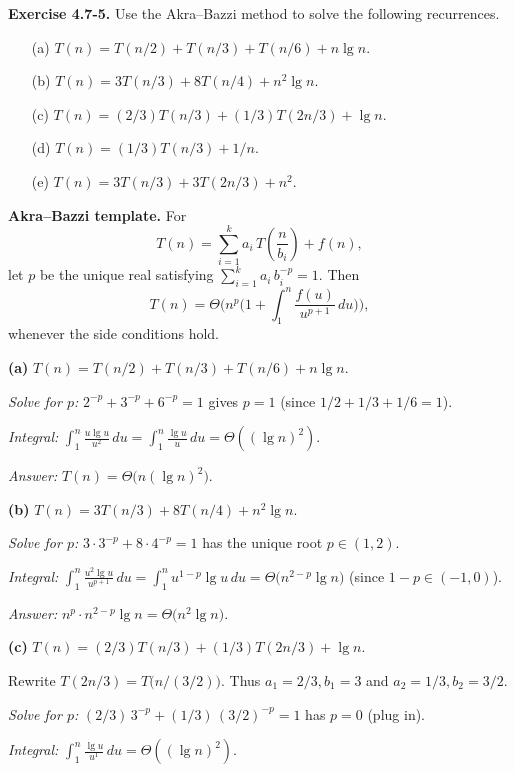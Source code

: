 \documentclass[12pt]{article}
\theoremstyle{definition}
\begin{document}

\noindent\textbf{Exercise 4.7-5.}
Use the Akra–Bazzi method to solve the following recurrences.
\begin{enumerate}\itemsep4pt
\item[(a)] $T(n)=T(n/2)+T(n/3)+T(n/6)+n\lg n.$
\item[(b)] $T(n)=3T(n/3)+8T(n/4)+n^{2}\lg n.$
\item[(c)] $T(n)=(2/3)T(n/3)+(1/3)T(2n/3)+\lg n.$
\item[(d)] $T(n)=(1/3)T(n/3)+1/n.$
\item[(e)] $T(n)=3T(n/3)+3T(2n/3)+n^{2}.$
\end{enumerate}

\medskip
\noindent\textbf{Akra–Bazzi template.}
For
\[
T(n)=\sum_{i=1}^k a_i\,T\!\left(\frac{n}{b_i}\right)+f(n),
\]
let $p$ be the unique real satisfying $\sum_{i=1}^k a_i\,b_i^{-p}=1$. Then
\[
T(n)=\Theta\!\Big(n^{p}\Big(1+\int_{1}^{n}\frac{f(u)}{u^{p+1}}\,du\Big)\Big),
\]
whenever the side conditions hold.

\bigskip
\noindent\textbf{(a)} $T(n)=T(n/2)+T(n/3)+T(n/6)+n\lg n$.

\emph{Solve for $p$:} $2^{-p}+3^{-p}+6^{-p}=1$ gives $p=1$ (since $1/2+1/3+1/6=1$).

\emph{Integral:}
$\displaystyle \int_{1}^{n}\frac{u\lg u}{u^{2}}\,du=\int_{1}^{n}\frac{\lg u}{u}\,du=\Theta((\lg n)^2)$.

\emph{Answer:} $\boxed{T(n)=\Theta\big(n(\lg n)^{2}\big)}$.

\bigskip
\noindent\textbf{(b)} $T(n)=3T(n/3)+8T(n/4)+n^{2}\lg n$.

\emph{Solve for $p$:} $3\cdot 3^{-p}+8\cdot 4^{-p}=1$ has the unique root $p\in(1,2)$.

\emph{Integral:} $\displaystyle \int_{1}^{n}\frac{u^{2}\lg u}{u^{p+1}}\,du
= \int_{1}^{n}u^{1-p}\lg u\,du
= \Theta\!\big(n^{2-p}\lg n\big)$ (since $1-p\in(-1,0)$).

\emph{Answer:} $n^{p}\cdot n^{2-p}\lg n=\boxed{\Theta\big(n^{2}\lg n\big)}$.

\bigskip
\noindent\textbf{(c)} $T(n)=(2/3)T(n/3)+(1/3)T(2n/3)+\lg n$.

Rewrite $T(2n/3)=T\!\big(n/(3/2)\big)$. Thus $a_1=2/3,b_1=3$ and $a_2=1/3,b_2=3/2$.

\emph{Solve for $p$:} $(2/3)\,3^{-p}+(1/3)\,(3/2)^{-p}=1$ has $p=0$ (plug in).

\emph{Integral:} $\displaystyle \int_{1}^{n}\frac{\lg u}{u^{1}}\,du=\Theta((\lg n)^2)$.
\end{document}

